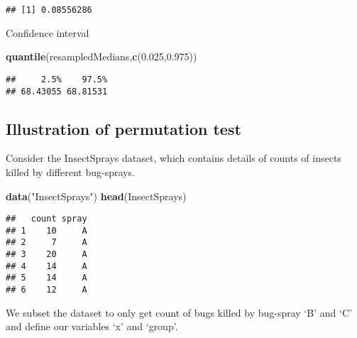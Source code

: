 \documentclass[
]{article}
\newenvironment{Shaded}{\begin{snugshade}}{\end{snugshade}}
\newcommand{\FloatTok}[1]{\textcolor[rgb]{0.00,0.00,0.81}{#1}}
\newcommand{\KeywordTok}[1]{\textcolor[rgb]{0.13,0.29,0.53}{\textbf{#1}}}
\newcommand{\NormalTok}[1]{#1}
\newcommand{\OperatorTok}[1]{\textcolor[rgb]{0.81,0.36,0.00}{\textbf{#1}}}
\newcommand{\StringTok}[1]{\textcolor[rgb]{0.31,0.60,0.02}{#1}}
\begin{document}
\begin{verbatim}
## [1] 0.08556286
\end{verbatim}

Confidence interval

\begin{Shaded}
\begin{Highlighting}[]
\KeywordTok{quantile}\NormalTok{(resampledMedians,}\KeywordTok{c}\NormalTok{(}\FloatTok{0.025}\NormalTok{,}\FloatTok{0.975}\NormalTok{))}
\end{Highlighting}
\end{Shaded}

\begin{verbatim}
##     2.5%    97.5% 
## 68.43055 68.81531
\end{verbatim}

\hypertarget{illustration-of-permutation-test}{%
\subsection{Illustration of permutation
test}\label{illustration-of-permutation-test}}

Consider the InsectSprays dataset, which contains details of counts of
insects killed by different bug-sprays.

\begin{Shaded}
\begin{Highlighting}[]
\KeywordTok{data}\NormalTok{(}\StringTok{"InsectSprays"}\NormalTok{)}
\KeywordTok{head}\NormalTok{(InsectSprays)}
\end{Highlighting}
\end{Shaded}

\begin{verbatim}
##   count spray
## 1    10     A
## 2     7     A
## 3    20     A
## 4    14     A
## 5    14     A
## 6    12     A
\end{verbatim}

We subset the dataset to only get count of bugs killed by bug-spray `B'
and `C' and define our variables `x' and `group'.

\begin{Shaded}
\end{Shaded}
\end{document}
